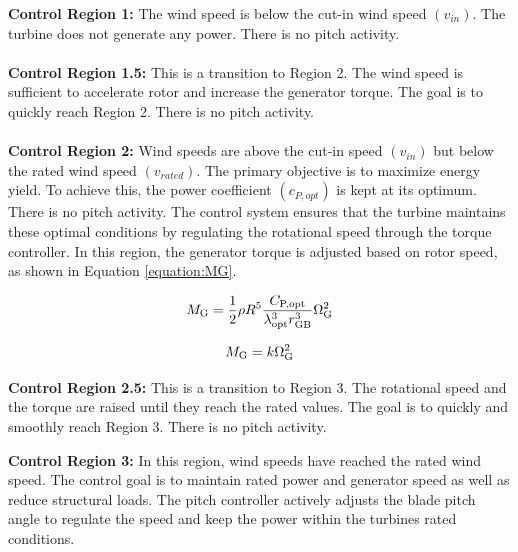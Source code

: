 \textbf{Control Region 1:} The wind speed is below the cut-in wind speed $(v_{in})$. 
The turbine does not generate any power.
There is no pitch activity.
\\
\\
\textbf{Control Region 1.5:} This is a transition to Region 2.
The wind speed is sufficient to accelerate rotor and increase the generator torque.
The goal is to quickly reach Region 2.
There is no pitch activity.
\\
\\
\textbf{Control Region 2:} Wind speeds are above the cut-in speed $(v_{in})$ but below the rated wind speed $(v_{rated})$. 
The primary objective is to maximize energy yield.
To achieve this, the power coefficient $(c_{P,opt})$ is kept at its optimum. 
There is no pitch activity.
The control system ensures that the turbine maintains these optimal conditions by regulating the rotational speed through the torque controller.
In this region, the generator torque is adjusted based on rotor speed, as shown in Equation \ref{equation:MG}.

\begin{equation}
	M_{\textnormal{G}} = \frac{1}{2} \rho R^5 \frac{C_{\textnormal{P,opt}}}{{\lambda_{\textnormal{opt}}^3 r_{\textnormal{GB}}^3}} \Omega_{\textnormal{G}}^2
	\label{equation:MG}
\end{equation}

\begin{equation}
	M_{\textnormal{G}} = k\Omega_{\textnormal{G}}^2
	\label{equation:MG_2}
\end{equation}

\textbf{Control Region 2.5:} This is a transition to Region 3.
The rotational speed and the torque are raised until they reach the rated values. 
The goal is to quickly and smoothly reach Region 3.
There is no pitch activity.

\textbf{Control Region 3:} 
In this region, wind speeds have reached the rated wind speed.
The control goal is to maintain rated power and generator speed as well as reduce structural loads.
The pitch controller actively adjusts the blade pitch angle to regulate the speed and keep the power within the turbines rated conditions.
